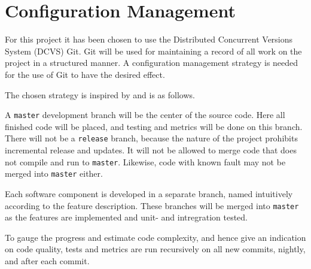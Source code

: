\documentclass[Main_Assignment3]{subfiles}
\begin{document}
	\section{Configuration Management} %
		\label{sec:configuration_management}
		For this project it has been chosen to use the Distributed Concurrent Versions System (DCVS) Git.
		Git will be used for maintaining a record of all work on the project in a structured manner.
		A configuration management strategy is needed for the use of Git to have the desired effect.

		The chosen strategy is inspired by \cite{vincentdriessen2010} and is as follows.

		A \texttt{master} development branch will be the center of the source code. Here all finished code will be placed, and testing and metrics will be done on this branch.
		There will not be a \texttt{release} branch, because the nature of the project prohibits incremental release and updates.
		It will not be allowed to merge code that does not compile and run to \texttt{master}.
		Likewise, code with known fault may not be merged into \texttt{master} either.

		Each software component is developed in a separate branch, named intuitively according to the feature description.
		These branches will be merged into \texttt{master} as the features are implemented and unit- and intregration tested.

		To gauge the progress and estimate code complexity, and hence give an indication on code quality, tests and metrics are run recursively on all new commits, nightly, and after each commit.

\end{document}
